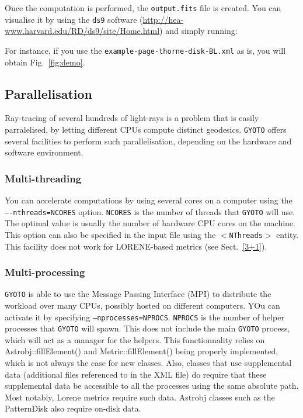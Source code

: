 \documentclass[a4paper,12pt]{article}
\begin{document}
Once the computation is performed, the \texttt{output.fits} file is created. You can visualise it by using the \texttt{ds9} software (\url{http://hea-www.harvard.edu/RD/ds9/site/Home.html}) and simply running:


For instance, if you use the \texttt{example-page-thorne-disk-BL.xml} as is, you will obtain Fig.~\ref{fig:demo}.

\subsection{Parallelisation}

Ray-tracing of several hundreds of light-rays is a problem that is
easily parralelised, by letting different CPUs compute distinct
geodesics. \texttt{GYOTO} offers several facilities to perform such
parallelisation, depending on the hardware and software environment.

\subsubsection{Multi-threading}

You can accelerate computations by using several cores on a computer
using the \texttt{----nthreads=NCORES} option. \texttt{NCORES} is the
number of threads that \texttt{GYOTO} will use. The optimal value is
usually the number of hardware CPU cores on the machine. This option
can also be specified in the input file using the
\texttt{$<$NThreads$>$} entity. This facility does not work for
LORENE-based metrics (see Sect.~\ref{3+1}).

\subsubsection{Multi-processing}

\texttt{GYOTO} is able to use the Message Passing Interface (MPI) to
distribute the workload over many CPUs, possibly hosted on different
computers. YOu can activate it by specifying
\texttt{--nprocesses=NPROCS}. \texttt{NPROCS} is the number of helper
processes that \texttt{GYOTO} will spawn. This does not include the
main \texttt{GYOTO} process, which will act as a manager for the
helpers. This functionnality relies on Astrobj::fillElement() and
Metric::fillElement() being properly implemented, which is not always
the case for new classes. Also, classes that use supplemental data
(additional files referenced to in the XML file) do require that these
supplemental data be accessible to all the processes using the same
absolute path. Most notably, Lorene metrics require such data. Astrobj
classes such as the PatternDisk also require on-disk data.
\end{document}
